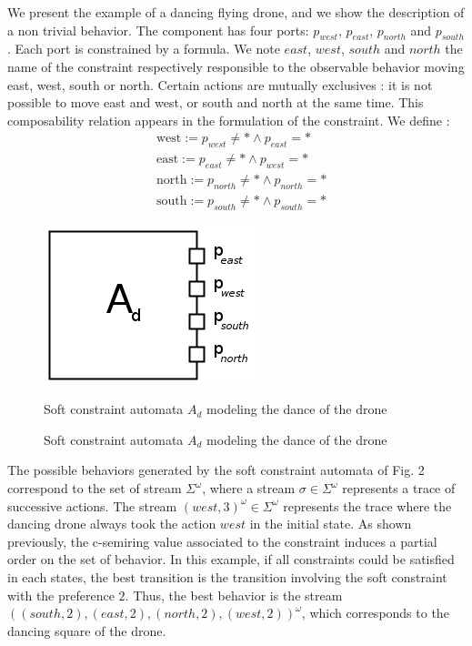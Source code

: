\begin{example}
	We present the example of a dancing flying drone, and we show the description of a non trivial behavior. The component has four ports: $p_{west}$, $p_{east}$, $p_{north}$ and $p_{south}$. Each port is constrained by a formula. We note $east$, $west$, $south$ and $north$ the name of the constraint respectively responsible to the observable behavior moving east, west, south or north. Certain actions are mutually exclusives : it is not possible to move east and west, or south and north at the same time. This composability relation appears in the formulation of the constraint. We define : 
	\begin{align*}
		& \text{west} := p_{west} \not = * \land p_{east} = * \\
		& \text{east} := p_{east} \not = * \land p_{west} = * \\
		& \text{north} := p_{north} \not = * \land p_{north} = * \\
		& \text{south} := p_{south} \not = * \land p_{south} = * 
	\end{align*}

	\begin{figure}[t]
	\centering
	\label{fig:Components}{\includegraphics[scale=0.4]{pic/dancing_drone.png}}
	\qquad
	\caption{Soft constraint automata $A_d$ modeling the dance of the drone}
	\end{figure}
	
	\begin{figure}[H]
		\centering
		\resizebox{8cm}{!}{}
		\caption{Soft constraint automata $A_d$ modeling the dance of the drone}
		\label{moveSCA}
	\end{figure}

	The possible behaviors generated by the soft constraint automata of Fig. 2 correspond to the set of stream $\Sigma^{\omega}$, where a stream $\sigma \in \Sigma^{\omega}$ represents a trace of successive actions. The stream $(west,3)^{\omega} \in \Sigma^{\omega}$ represents the trace where the dancing drone always took the action $west$ in the initial state. As shown previously, the c-semiring value associated to the constraint induces a partial order on the set of behavior. In this example, if all constraints could be satisfied in each states, the best transition is the transition involving the soft constraint with the preference $2$. Thus, the best behavior is the stream $((south,2),(east,2),(north,2),(west,2))^{\omega}$, which corresponds to the dancing square of the drone.


\end{example}
